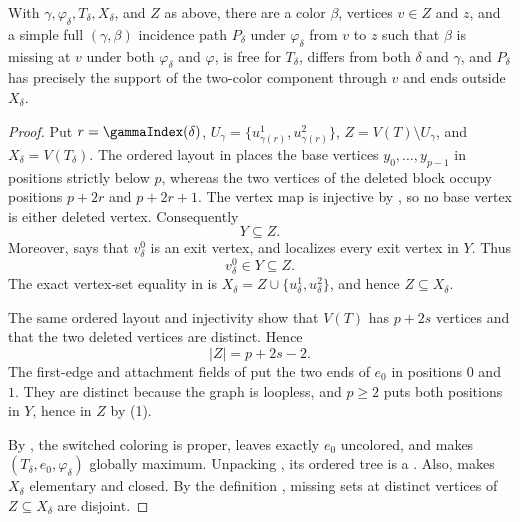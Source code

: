 \begin{helper}
With $\gamma,\varphi_\delta,T_\delta,X_\delta$, and $Z$ as above, there
are a color $\beta$, vertices $v\in Z$ and $z$, and a simple full
$(\gamma,\beta)$ incidence path $P_\delta$ under $\varphi_\delta$ from
$v$ to $z$ such that $\beta$ is missing at $v$ under both
$\varphi_\delta$ and $\varphi$, is free for $T_\delta$, differs from
both $\delta$ and $\gamma$, and $P_\delta$ has precisely the support of
the two-color component through $v$ and ends outside $X_\delta$.
\end{helper}
\begin{proof}
Put $r=\gammaIndex(\delta)$,
$U_\gamma=\{u^1_{\gamma(r)},u^2_{\gamma(r)}\}$,
$Z=V(T)\setminus U_\gamma$, and $X_\delta=V(T_\delta)$.
The ordered layout in  places
the base vertices $y_0,\ldots,y_{p-1}$ in positions strictly below $p$,
whereas the two vertices of the deleted block occupy positions
$p+2r$ and $p+2r+1$.  The vertex map is injective by
, so no base vertex is either deleted vertex.
Consequently
\[
                         Y\subseteq Z.                              \tag{1}
\]
Moreover,  says that
$v^0_\delta$ is an exit vertex, and
 localizes every exit vertex in
$Y$.  Thus
\[
                         v^0_\delta\in Y\subseteq Z.                \tag{2}
\]
The exact vertex-set equality in  is
$X_\delta=Z\cup\{u^1_\delta,u^2_\delta\}$, and hence $Z\subseteq
X_\delta$.

The same ordered layout and injectivity show that $V(T)$ has
$p+2s$ vertices and that the two deleted vertices are distinct.  Hence
\[
                         |Z|=p+2s-2.                               \tag{3}
\]
The first-edge and attachment fields of  put the
two ends of $e_0$ in positions $0$ and $1$.  They are distinct because
the graph is loopless, and $p\geq2$ puts both positions in $Y$, hence in
$Z$ by (1).

By , the switched coloring is proper,
leaves exactly $e_0$ uncolored, and makes
$(T_\delta,e_0,\varphi_\delta)$ globally maximum.  Unpacking
, its ordered tree is a
.  Also,
 makes $X_\delta$ elementary and
closed.  By the definition , missing
sets at distinct vertices of $Z\subseteq X_\delta$ are disjoint.


\end{proof}
